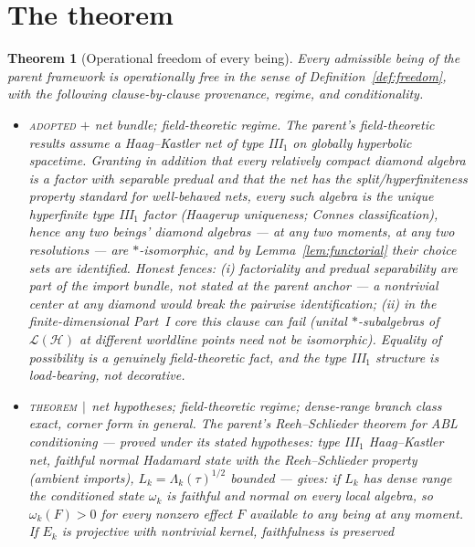 \documentclass[11pt]{article}
\newtheorem{theorem}{Theorem}
\newcommand{\THMC}[1]{{\normalfont\scshape theorem}$\,\mid\,${\normalfont\small #1}} %
\newcommand{\ADOPTED}{{\normalfont\scshape adopted}}            %
\newcommand{\HH}{\mathcal H}
\begin{document}
\section{The theorem}\label{sec:theorem}

\begin{theorem}[Operational freedom of every being]\label{thm:freedom}
Every admissible being of the parent framework is operationally free in the
sense of Definition~\ref{def:freedom}, with the following clause-by-clause
provenance, regime, and conditionality.
\begin{itemize}
\item[\textbf{(F1a)}] \ADOPTED{} $+$ net bundle; field-theoretic regime. The
parent's field-theoretic results assume a Haag--Kastler net of type III$_1$ on
globally hyperbolic spacetime.
Granting in addition that every relatively compact diamond algebra is a
\emph{factor} with separable predual and that the net has the
split/hyperfiniteness property standard for well-behaved nets, every such
algebra is the unique hyperfinite type III$_1$ factor (Haagerup uniqueness;
Connes classification), hence any two beings' diamond algebras --- at any two
moments, at any two resolutions --- are $*$-isomorphic, and by
Lemma~\ref{lem:functorial} their choice sets are identified. \emph{Honest
fences:} (i) factoriality and predual separability are part of the import
bundle, not stated at the parent anchor --- a nontrivial center at any diamond
would break the pairwise identification; (ii) in the finite-dimensional Part~I
core this clause can fail (unital $*$-subalgebras of $\mathcal L(\HH)$ at
different worldline points need not be isomorphic). Equality of possibility is
a genuinely field-theoretic fact, and the type III$_1$ structure is
load-bearing, not decorative.
\item[\textbf{(F1b)}] \THMC{net hypotheses}; field-theoretic regime; dense-range
branch class exact, corner form in general. The parent's Reeh--Schlieder theorem
for ABL conditioning --- proved under its stated hypotheses: type III$_1$
Haag--Kastler net, faithful normal Hadamard state with the Reeh--Schlieder
property (ambient imports), $L_k=\Lambda_k(\tau)^{1/2}$ bounded --- gives: if
$L_k$ has dense range the conditioned state $\omega_k$ is faithful and normal on
every local algebra, so $\omega_k(F)>0$ for every nonzero effect $F$ available
to any being at any moment.
If $E_k$ is projective with nontrivial kernel, faithfulness is preserved

\end{itemize}
\end{theorem}
\end{document}
